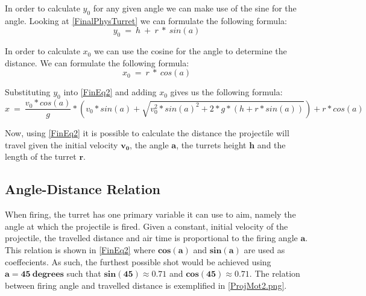 In order to calculate $y_0$ for any given angle we can make use of the sine for
the angle. Looking at \autoref{FinalPhysTurret} we can formulate the following
formula:
\begin{equation}\label{Y0Eq}
y_0\ =\ h\ +\ r\ *\ sin(a)
\end{equation}

In order to calculate $x_0$ we can use the cosine for the angle to determine the
distance. We can formulate the following formula:
\begin{equation}\label{Y0Eq}
x_0\ =\ r\ *\ cos(a)
\end{equation}

Substituting $y_0$ into \autoref{FinEq2} and adding $x_0$ gives
us the following formula:
\begin{equation}\label{FinEq3}
x\ =\ \frac{v_0*cos(a)}{g}* \left(
v_0*sin(a)+\sqrt{v_0^2*sin(a)^2+2*g*(h+r*sin(a))}\right)+r*cos(a)
\end{equation}

Now, using \autoref{FinEq2} it is possible to calculate the
distance the projectile will travel given the initial velocity $\mathbf{v_0}$,
the angle $\mathbf{a}$, the turrets height $\mathbf{h}$ and the length of the
turret $\mathbf{r}$.

\subsection{Angle-Distance Relation}
When firing, the turret has one primary variable it can use to aim,
namely the angle at which the projectile is fired. Given a constant, initial
velocity of the projectile, the travelled distance and air time is proportional
to the firing angle $\mathbf{a}$. This relation is shown in \autoref{FinEq2}
where $\mathbf{cos(a)}$ and $\mathbf{sin(a)}$ are used as coeffecients. As
such, the furthest possible shot would be achieved using $\mathbf{a=45\
degrees}$ such that $\mathbf{sin(45)\approx 0.71}$ and $\mathbf{cos(45)\approx
0.71}$. The relation between firing angle and travelled distance is exemplified
in \autoref{ProjMot2.png}.




